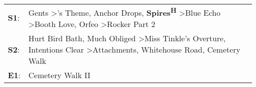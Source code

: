 \begin{supertabular}{p{0.03\textwidth}p{0.92\textwidth}}
 \textbf{S1}:  &  Gents\textsuperscript{} \textgreater {}'s Theme\textsuperscript{}, \enspace Anchor Drops\textsuperscript{}, \enspace \textbf{Spires\textsuperscript{H}} \textgreater \enspace Blue Echo\textsuperscript{} \textgreater \enspace Booth Love\textsuperscript{}, \enspace Orfeo\textsuperscript{} \textgreater \enspace Rocker Part 2\textsuperscript{}  \enspace  \\
 \textbf{S2}:  &                                Hurt Bird Bath\textsuperscript{}, \enspace Much Obliged\textsuperscript{} \textgreater \enspace Miss Tinkle's Overture\textsuperscript{}, \enspace Intentions Clear\textsuperscript{} \textgreater \enspace Attachments\textsuperscript{}, \enspace Whitehouse Road\textsuperscript{}, \enspace Cemetery Walk\textsuperscript{}  \enspace  \\
 \textbf{E1}:  &                                                                                                                                                                                                                                                                                                                             Cemetery Walk II\textsuperscript{}  \enspace  \\
\end{supertabular}

